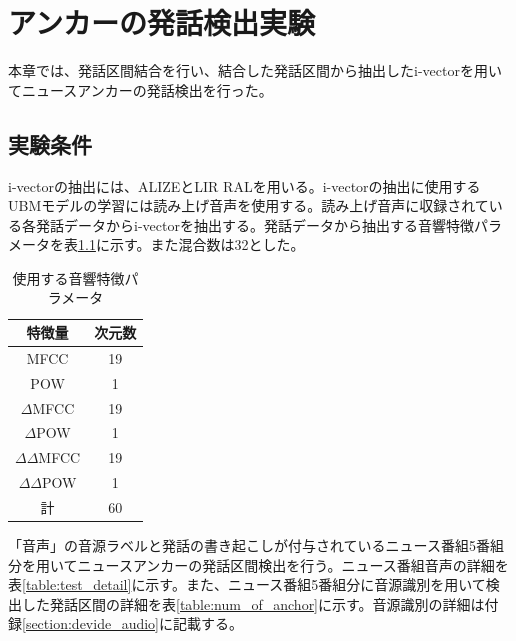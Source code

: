 \chapter{アンカーの発話検出実験}
\label{chapter:get_anchor}
本章では、発話区間結合を行い、結合した発話区間から抽出したi-vectorを用いてニュースアンカーの発話検出を行った。

\section{実験条件}
i-vectorの抽出には、ALIZEとLIR RAL\cite{alize}を用いる。i-vectorの抽出に使用するUBMモデルの学習には読み上げ音声\cite{ATR}を使用する。読み上げ音声に収録されている各発話データからi-vectorを抽出する。発話データから抽出する音響特徴パラメータを表\ref{iv_feature2}に示す。また混合数は32とした。\par

\begin{table}[H]
  \begin{center}
    \caption{使用する音響特徴パラメータ \label{iv_feature2}}
    \begin{tabular}{|c||c|} \hline
      特徴量 & 次元数\\ \hline
      MFCC & 19  \\ 
      POW & 1  \\ 
      $\Delta$MFCC & 19 \\ 
      $\Delta$POW & 1 \\ 
      $\Delta\Delta$MFCC & 19 \\ 
      $\Delta\Delta$POW & 1 \\ \hline
      計 & 60 \\ \hline
    \end{tabular}
  \end{center}
\end{table}

\vspace{0.2in}\par
「音声」の音源ラベルと発話の書き起こしが付与されているニュース番組5番組分を用いてニュースアンカーの発話区間検出を行う。ニュース番組音声の詳細を表\ref{table:test_detail}に示す。また、ニュース番組5番組分に音源識別を用いて検出した発話区間の詳細を表\ref{table:num_of_anchor}に示す。音源識別の詳細は付録\ref{section:devide_audio}に記載する。

